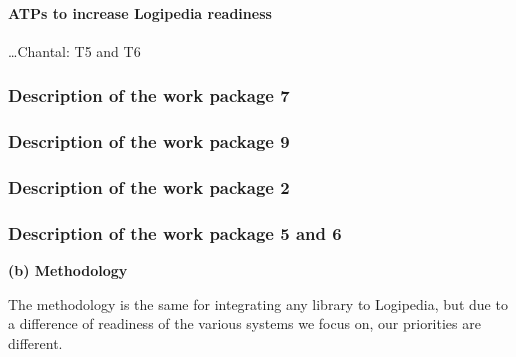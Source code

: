 \paragraph{ATPs to increase {\sf Logipedia} readiness}

\dots Chantal: T5 and T6


\subsubsection{Description of the work package 7}

\subsubsection{Description of the work package 9}

\subsubsection{Description of the work package 2}

\subsubsection{Description of the work package 5 and 6}

{\bf (b) Methodology}

The methodology is the same for integrating any library to {\sf Logipedia},
but due to a difference of readiness of the various systems we focus on,
our priorities are different.

